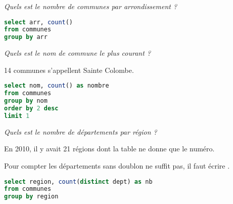 \begin{Exercise}
\it Quels est le nombre de communes par arrondissement ?
\end{Exercise}
\begin{Answer}
\begin{lstlisting}[language=SQL]
select arr, count()
from communes
group by arr
\end{lstlisting}
\end{Answer}
\begin{Exercise}[label = ques:nomPlus]
\it Quels est le nom de commune le plus courant ?

14 communes s'appellent Sainte Colombe.
\end{Exercise}
\begin{Answer}
\begin{lstlisting}[language=SQL]
select nom, count() as nombre
from communes
group by nom
order by 2 desc
limit 1
\end{lstlisting}
\end{Answer}
\begin{Exercise}[label = ques:nomPlus]
\it Quels est le nombre de départements par région ?

En 2010, il y avait 21 régions dont la table ne donne que le numéro.

Pour compter les départements sans doublon  ne suffit pas, il faut écrire .
\end{Exercise}
\begin{Answer}
\begin{lstlisting}[language=SQL]
select region, count(distinct dept) as nb
from communes
group by region
\end{lstlisting}
\end{Answer}
